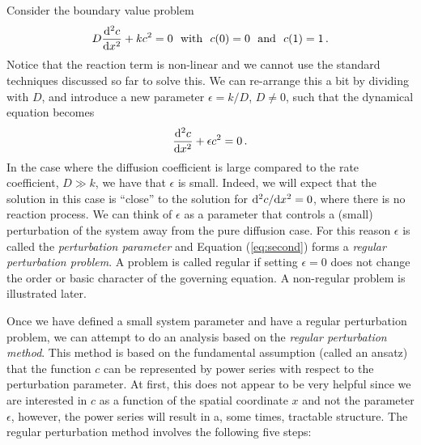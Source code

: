 Consider the boundary value problem
\begin{equation}
  D\frac{\d^2c}{\d x^2} + k c^2 = 0 \ \ \text{with} \ \ 
  c(0) = 0 \ \ \text{and} \ \ c(1)=1 \, .
\end{equation}
Notice that the reaction term is non-linear and we cannot use the standard
techniques discussed so far to solve this. We can re-arrange this a bit by dividing with $D$, and introduce a 
new parameter $\epsilon = k/D$, $D \neq 0$, 
such that the dynamical equation becomes
\begin{equation}
  \label{eq:second}
  \frac{\mathrm{d}^2c}{\mathrm{d} x^2} + \epsilon c^2 = 0 \, . 
\end{equation}
In the case where the diffusion coefficient is large compared to the rate coefficient, $D \gg k$, 
we have that $\epsilon$ is small. Indeed, we will expect that the solution in this case 
is ``close'' to the solution for $\mathrm{d}^2c/\mathrm{d} x^2 = 0$,  
where there is no reaction process. We can think of $\epsilon$ as a parameter that controls 
a (small) perturbation of the system away from the pure diffusion case. 
For this reason $\epsilon$ is called the \emph{perturbation parameter} and Equation (\ref{eq:second}) 
forms a \emph{regular perturbation problem}\index{Perturbation!regular problem}. A problem is called
regular if setting $\epsilon = 0$  
does not change the order or basic character of the governing equation. A non-regular problem is illustrated later.

Once we have defined a small system parameter and have a regular perturbation problem, 
we can attempt to do an analysis based on the \emph{regular perturbation method}. 
This method is based on the fundamental assumption (called an ansatz) that the function
$c$ can be represented by power series with respect to the perturbation parameter. 
At first, this does not appear to be very helpful since we are interested in $c$ as a
function of the spatial coordinate $x$ and not the parameter $\epsilon$,
however, the power series will result in a, some times, tractable structure. The
regular perturbation method involves the following five steps:

